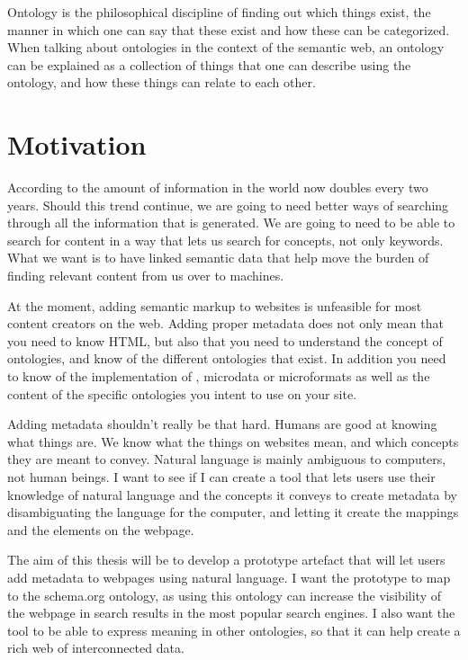 Ontology is the philosophical discipline of finding out which things exist,
the manner in which one can say that these exist and how these can be categorized.
When talking about ontologies in the context of the semantic web,
an ontology can be explained as a collection of things that one can describe using the ontology,
and how these things can relate to each other.


\section{Motivation}
According to \citet{Gantz2011} the amount of information in the world now doubles every two years.
Should this trend continue, we are going to need better ways of searching through all the information that is generated.
We are going to need to be able to search for content in a way that lets us search for concepts, not only keywords.
What we want is to have linked semantic data that help move the burden of finding relevant content from us over to machines.

At the moment, adding semantic markup to websites is unfeasible for most content creators on the web.
Adding proper metadata does not only mean that you need to know HTML,
but also that you need to understand the concept of ontologies, and know of the different ontologies that exist.
In addition you need to know of the implementation of , microdata or microformats
as well as the content of the specific ontologies you intent to use on your site.

Adding metadata shouldn't really be that hard.
Humans are good at knowing what things are.
We know what the things on websites mean, and which concepts they are meant to convey.
Natural language is mainly ambiguous to computers, not human beings.
I want to see if I can create a tool that lets users use their knowledge of natural language and the concepts it conveys
to create metadata by disambiguating the language for the computer, and letting it create the mappings and the elements on the webpage.

The aim of this thesis will be to develop a prototype artefact that will let users add metadata to webpages using natural language.
I want the prototype to map to the schema.org ontology,
as using this ontology can increase the visibility of the webpage in search results in the most popular search engines.
I also want the tool to be able to express meaning in other ontologies, so that it can help create a rich web of interconnected data.

